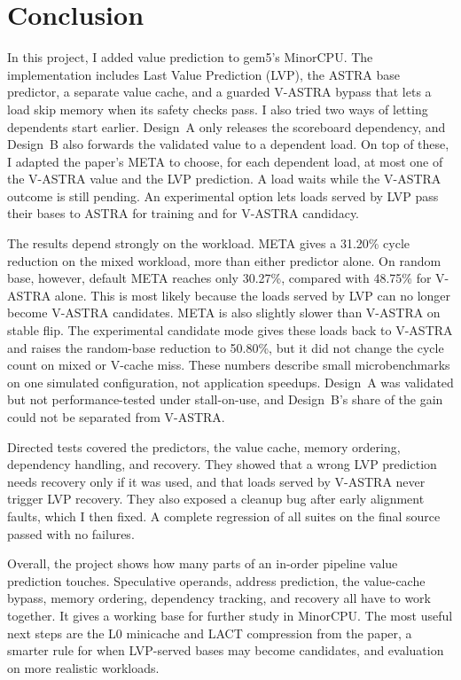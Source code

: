 \section{Conclusion}

In this project, I added value prediction to gem5's MinorCPU. The
implementation includes Last Value Prediction (LVP), the ASTRA base
predictor, a separate value cache, and a guarded V-ASTRA bypass that
lets a load skip memory when its safety checks pass. I also tried two
ways of letting dependents start earlier. Design~A only releases the
scoreboard dependency, and Design~B also forwards the validated value
to a dependent load. On top of these, I adapted the paper's META to
choose, for each dependent load, at most one of the V-ASTRA value and
the LVP prediction. A load waits while the V-ASTRA outcome is still
pending. An experimental option lets loads served by LVP pass their
bases to ASTRA for training and for V-ASTRA candidacy.

The results depend strongly on the workload. META gives a 31.20\%
cycle reduction on the mixed workload, more than either predictor
alone. On random base, however, default META reaches only 30.27\%,
compared with 48.75\% for V-ASTRA alone. This is most likely because
the loads served by LVP can no longer become V-ASTRA candidates. META
is also slightly slower than V-ASTRA on stable flip. The experimental
candidate mode gives these loads back to V-ASTRA and raises the
random-base reduction to 50.80\%, but it did not change the cycle
count on mixed or V-cache miss. These numbers describe small
microbenchmarks on one simulated configuration, not application
speedups. Design~A was validated but not performance-tested under
stall-on-use, and Design~B's share of the gain could not be separated
from V-ASTRA.

Directed tests covered the predictors, the value cache, memory
ordering, dependency handling, and recovery. They showed that a wrong
LVP prediction needs recovery only if it was used, and that loads
served by V-ASTRA never trigger LVP recovery. They also exposed a
cleanup bug after early alignment faults, which I then fixed. A
complete regression of all suites on the final source passed with no
failures.

Overall, the project shows how many parts of an in-order pipeline
value prediction touches. Speculative operands, address prediction,
the value-cache bypass, memory ordering, dependency tracking, and
recovery all have to work together. It gives a working base for
further study in MinorCPU. The most useful next steps are the L0
minicache and LACT compression from the paper, a smarter rule for
when LVP-served bases may become candidates, and evaluation on more
realistic workloads.
